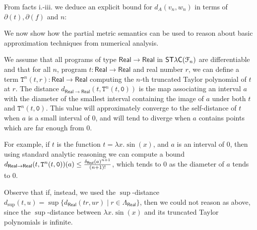 \begin{example}
\begin{itemize}
\end{itemize}

From facts i.-iii. we deduce an explicit bound for $d_{A}(v_{n},w_{n}    )$ in terms of $\partial(t), \partial(f)$ and $n$: \\

\end{example}

We now show how the partial metric semantics can be used to reason about 
basic approximation techniques from numerical analysis.  


\begin{example}

We assume that all programs of type $\mathsf{Real}\to\mathsf{Real}$ in $\mathsf{ST\lambda C}(\mathcal F_{n})$ are differentiable and that for all $n$, program $t:\mathsf{Real}\to\mathsf{Real}$ and real number $r$, we can define a term 
$\mathtt T^{n}( t, r):\mathsf{Real}\to\mathsf{Real}$ computing the $n$-th truncated Taylor polynomial of $t$ at $r$. 
The distance 
$d_{\mathsf{Real}\to\mathsf{Real}}(t, \mathtt T^{n}( t,\mathtt 0 ))$ is the map associating an interval $a$ with the diameter of the smallest interval containing the image of $a$ under both $t$ and $\mathtt T^{n}( t,\mathtt 0 )$. 
This value will approximately converge to the self-distance of $t$ when $a$ is a small interval of $0$, and will tend to diverge when $a$ contains points which are far enough from 0. 

For example, if $t$ is the function $t=\lambda x.\sin(x)$, and $a$ is an interval of $0$, then using standard analytic reasoning we can compute a bound
$d_{\mathsf{Real}\to \mathsf{Real}}(t, \mathtt T^{n}( t,\mathtt 0 ))(a  )\leq \frac{\delta_{\mathsf{Real}}(a)^{n+1}}{(n+1)!} $, which tends to $0$ as the diameter of $a$ tends to $0$.

Observe that if, instead, we used the $\sup$-distance $d_{\sup}(t,u)= \sup\{d_{\mathsf{Real}}(tr, ur)\mid r\in \Lambda_{\mathsf{Real}}\}$, then we could not reason as above, since  the $\sup$-distance between $\lambda x.\sin(x)$ and its  truncated Taylor polynomials is infinite.  

\end{example}

